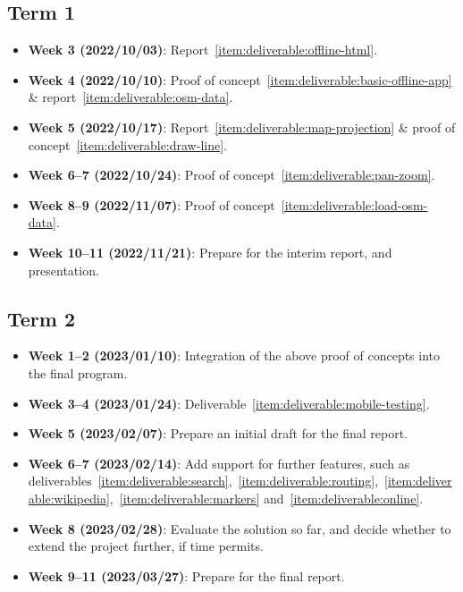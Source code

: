 \documentclass{final_report}
\begin{document}
\subsection{Term 1}

\begin{itemize}
    \item \textbf{Week 3 (2022/10/03)}: Report~\ref{item:deliverable:offline-html}.
    \item \textbf{Week 4 (2022/10/10)}: Proof of concept~\ref{item:deliverable:basic-offline-app} \& report~\ref{item:deliverable:osm-data}.
    \item \textbf{Week 5 (2022/10/17)}: Report~\ref{item:deliverable:map-projection} \& proof of concept~\ref{item:deliverable:draw-line}.
    \item \textbf{Week 6--7 (2022/10/24)}: Proof of concept~\ref{item:deliverable:pan-zoom}.
    \item \textbf{Week 8--9 (2022/11/07)}: Proof of concept~\ref{item:deliverable:load-osm-data}.
    \item \textbf{Week 10--11 (2022/11/21)}: Prepare for the interim report, and presentation.
\end{itemize}

\subsection{Term 2}

\begin{itemize}
    \item \textbf{Week 1--2 (2023/01/10)}: Integration of the above proof of concepts into the final program.
    \item \textbf{Week 3--4 (2023/01/24)}: Deliverable~\ref{item:deliverable:mobile-testing}.
    \item \textbf{Week 5 (2023/02/07)}: Prepare an initial draft for the final report.
    \item \textbf{Week 6--7 (2023/02/14)}: Add support for further features, such as deliverables~\ref{item:deliverable:search},~\ref{item:deliverable:routing},~\ref{item:deliverable:wikipedia},~\ref{item:deliverable:markers} and~\ref{item:deliverable:online}.
    \item \textbf{Week 8 (2023/02/28)}: Evaluate the solution so far, and decide whether to extend the project further, if time permits.
    \item \textbf{Week 9--11 (2023/03/27)}: Prepare for the final report.
\end{itemize}
\end{document}
